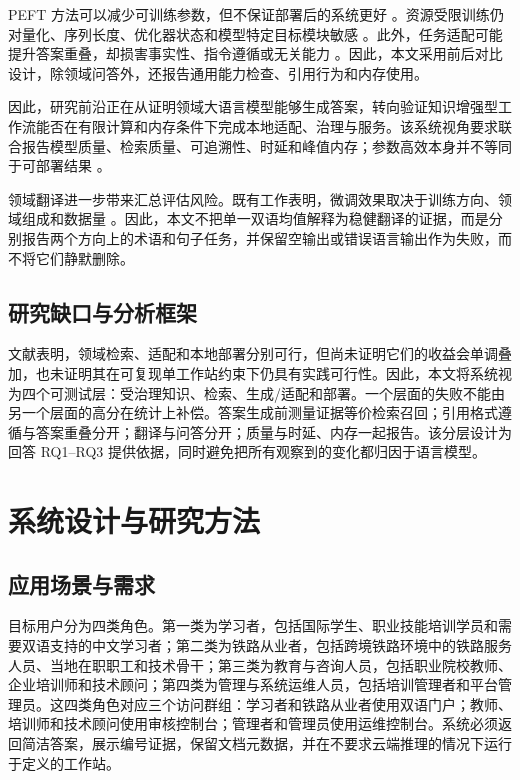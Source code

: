 PEFT 方法可以减少可训练参数，但不保证部署后的系统更好 \citep{ding2023peft,wang2025peft}。资源受限训练仍对量化、序列长度、优化器状态和模型特定目标模块敏感 \citep{lv2024full}。此外，任务适配可能提升答案重叠，却损害事实性、指令遵循或无关能力 \citep{tian2024factuality,barnett2024finetuning}。因此，本文采用前后对比设计，除领域问答外，还报告通用能力检查、引用行为和内存使用。

因此，研究前沿正在从证明领域大语言模型能够生成答案，转向验证知识增强型工作流能否在有限计算和内存条件下完成本地适配、治理与服务。该系统视角要求联合报告模型质量、检索质量、可追溯性、时延和峰值内存；参数高效本身并不等同于可部署结果 \citep{ding2023peft,lv2024full,wang2025peft}。

领域翻译进一步带来汇总评估风险。既有工作表明，微调效果取决于训练方向、领域组成和数据量 \citep{hu2024translation,vieira2024translation,zheng2024translation}。因此，本文不把单一双语均值解释为稳健翻译的证据，而是分别报告两个方向上的术语和句子任务，并保留空输出或错误语言输出作为失败，而不将它们静默删除。

\subsection{研究缺口与分析框架}

文献表明，领域检索、适配和本地部署分别可行，但尚未证明它们的收益会单调叠加，也未证明其在可复现单工作站约束下仍具有实践可行性。因此，本文将系统视为四个可测试层：受治理知识、检索、生成/适配和部署。一个层面的失败不能由另一个层面的高分在统计上补偿。答案生成前测量证据等价检索召回；引用格式遵循与答案重叠分开；翻译与问答分开；质量与时延、内存一起报告。该分层设计为回答 RQ1--RQ3 提供依据，同时避免把所有观察到的变化都归因于语言模型。

\section{系统设计与研究方法}

\subsection{应用场景与需求}

目标用户分为四类角色。第一类为学习者，包括国际学生、职业技能培训学员和需要双语支持的中文学习者；第二类为铁路从业者，包括跨境铁路环境中的铁路服务人员、当地在职职工和技术骨干；第三类为教育与咨询人员，包括职业院校教师、企业培训师和技术顾问；第四类为管理与系统运维人员，包括培训管理者和平台管理员。这四类角色对应三个访问群组：学习者和铁路从业者使用双语门户；教师、培训师和技术顾问使用审核控制台；管理者和管理员使用运维控制台。系统必须返回简洁答案，展示编号证据，保留文档元数据，并在不要求云端推理的情况下运行于定义的工作站。

